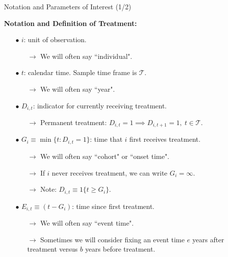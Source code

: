 \documentclass[usenames,dvipsnames]{beamer}
\begin{document}
\begin{frame}{Notation and Parameters of Interest (1/2)}
 
\vspace{-0.1cm}

\textbf{Notation and Definition of Treatment:}

\vspace{-0.05cm}

\begin{itemize}
\item[$\bullet$] $i$: unit of observation. 
\begin{itemize}
\item[$\rightarrow$]  We will often say ``individual".
\end{itemize}

\vspace{0.1cm}
\item[$\bullet$] $t$: calendar time. Sample time frame is $\mathcal{T}$.
\begin{itemize}
\item[$\rightarrow$] We will often say ``year".
\end{itemize}

\vspace{0.1cm}
\item[$\bullet$] $D_{i,t}$: indicator for currently receiving treatment.
\begin{itemize}
\item[$\rightarrow$] Permanent treatment: $D_{i,t} =1 \implies D_{i,t+1}=1,\; t \in \mathcal{T}$.
\end{itemize}

\vspace{0.1cm}
\item[$\bullet$] $G_i \equiv \min\{t: D_{i,t}=1\}$: time that $i$ first receives  treatment.
\begin{itemize}
\item[$\rightarrow$] We will often say ``cohort" or ``onset time".
\item[$\rightarrow$] If $i$ never receives treatment, we can write $G_i = \infty$. 
\item[$\rightarrow$] Note: $D_{i,t} \equiv 1\{t \geq G_i\}$.
\end{itemize}

\vspace{0.1cm}
\item[$\bullet$] $E_{i,t} \equiv (t - G_{i})$: time since first treatment. 
\begin{itemize}
\item[$\rightarrow$] We will often say ``event time".
\item[$\rightarrow$] Sometimes we will consider fixing an event time $e$ years after treatment versus $b$ years before treatment.
\end{itemize}


\end{itemize}
\end{frame}
\end{document}

